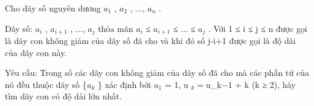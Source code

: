 Cho dãy số nguyên dương $a_{1}$ , $a_{2}$ , ..., $a_{n}$ .

Dãy số: $a_{i}$ , $a_{i+1}$ , ..., $a_{j}$ thỏa mãn $a_{i}$ ≤ $a_{i+1}$ ≤ ... ≤ $a_{j}$ . Với 1 ≤ i ≤ j ≤ n được gọi là dãy con không giảm của dãy số đã cho và khi đó số j-i+1 được gọi là độ dài của dãy con này.

Yêu cầu: Trong số các dãy con không giảm của dãy số đã cho mà các phần tử của nó đều thuộc dãy số \{$u_{k}$ \} xác định bởi $u_{1}$ = 1, u $_ k = $u_{k}$ -1 $ + k (k ≥ 2), hãy tìm dãy con có độ dài lớn nhất.